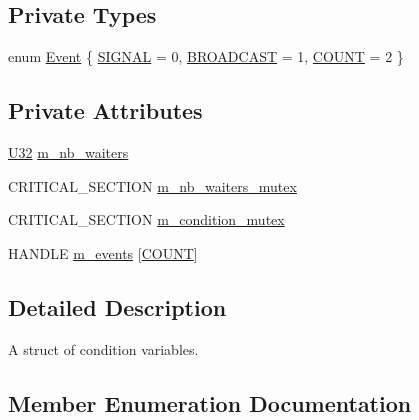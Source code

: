 \subsection*{Private Types}
\begin{DoxyCompactItemize}
\item 
enum \hyperlink{structmage_1_1_condition_variable_ae7627253bf4faebc0aae84a77920d195}{Event} \{ \hyperlink{structmage_1_1_condition_variable_ae7627253bf4faebc0aae84a77920d195a83361ddf52d1973875f7a48ac4bccf94}{S\+I\+G\+N\+AL} = 0, 
\hyperlink{structmage_1_1_condition_variable_ae7627253bf4faebc0aae84a77920d195a5863233d3c1e62ca806753b0d175199f}{B\+R\+O\+A\+D\+C\+A\+ST} = 1, 
\hyperlink{structmage_1_1_condition_variable_ae7627253bf4faebc0aae84a77920d195a553680ab09f088489b7d9f3cef9a5e14}{C\+O\+U\+NT} = 2
 \}
\end{DoxyCompactItemize}
\subsection*{Private Attributes}
\begin{DoxyCompactItemize}
\item 
\hyperlink{namespacemage_a41c104c036fba3756a74e19f793eeaa1}{U32} \hyperlink{structmage_1_1_condition_variable_a1166a25b69eb4b510b551c6c74a13046}{m\+\_\+nb\+\_\+waiters}
\item 
C\+R\+I\+T\+I\+C\+A\+L\+\_\+\+S\+E\+C\+T\+I\+ON \hyperlink{structmage_1_1_condition_variable_a0686e682d62d44ff1eb9ac45acbb0eab}{m\+\_\+nb\+\_\+waiters\+\_\+mutex}
\item 
C\+R\+I\+T\+I\+C\+A\+L\+\_\+\+S\+E\+C\+T\+I\+ON \hyperlink{structmage_1_1_condition_variable_ab5ff870b2881a1979ccaec986d762441}{m\+\_\+condition\+\_\+mutex}
\item 
H\+A\+N\+D\+LE \hyperlink{structmage_1_1_condition_variable_a00691d5e29735da356f577bb5522017d}{m\+\_\+events} \mbox{[}\hyperlink{structmage_1_1_condition_variable_ae7627253bf4faebc0aae84a77920d195a553680ab09f088489b7d9f3cef9a5e14}{C\+O\+U\+NT}\mbox{]}
\end{DoxyCompactItemize}


\subsection{Detailed Description}
A struct of condition variables. 

\subsection{Member Enumeration Documentation}
\hypertarget{structmage_1_1_condition_variable_ae7627253bf4faebc0aae84a77920d195}{}\label{structmage_1_1_condition_variable_ae7627253bf4faebc0aae84a77920d195} 
